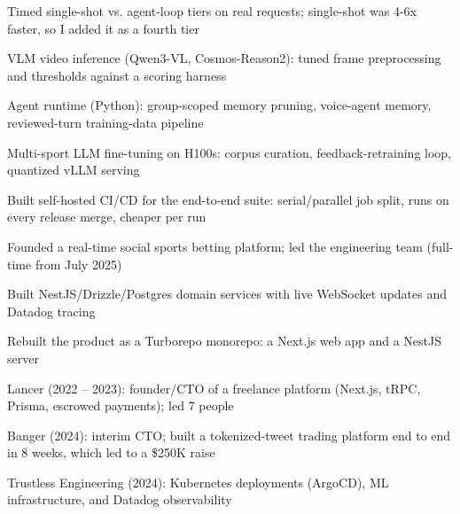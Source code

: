 \documentclass[print]{jack-resume}
\begin{document}
\begin{tightemize}
    \item Timed single-shot vs. agent-loop tiers on real requests; single-shot was 4-6x faster, so I added it as a fourth tier
    \item VLM video inference (Qwen3-VL, Cosmos-Reason2): tuned frame preprocessing and thresholds against a scoring harness
    \item Agent runtime (Python): group-scoped memory pruning, voice-agent memory, reviewed-turn training-data pipeline
    \item Multi-sport LLM fine-tuning on H100s: corpus curation, feedback-retraining loop, quantized vLLM serving
    \item Built self-hosted CI/CD for the end-to-end suite: serial/parallel job split, runs on every release merge, cheaper per run
\end{tightemize}
\sectionsep

\begin{tightemize}
    \item Founded a real-time social sports betting platform; led the engineering team (full-time from July 2025)
    \item Built NestJS/Drizzle/Postgres domain services with live WebSocket updates and Datadog tracing
    \item Rebuilt the product as a Turborepo monorepo: a Next.js web app and a NestJS server
\end{tightemize}
\sectionsep

\begin{tightemize}
    \item Lancer (2022 -- 2023): founder/CTO of a freelance platform (Next.js, tRPC, Prisma, escrowed payments); led 7 people
    \item Banger (2024): interim CTO; built a tokenized-tweet trading platform end to end in 8 weeks, which led to a \$250K raise
    \item Trustless Engineering (2024): Kubernetes deployments (ArgoCD), ML infrastructure, and Datadog observability
\end{tightemize}
\sectionsep
\end{document}
